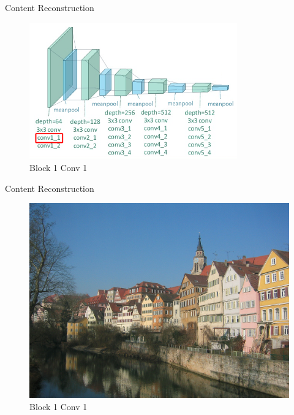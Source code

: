 \documentclass{beamer}
\begin{document}
\begin{frame}{Content Reconstruction}
\begin{figure}[ht]
\centering
\includegraphics[width=0.8\textwidth]{img/vgg19/content/block1_conv1}
\caption*{Block 1 Conv 1}
\end{figure}
\end{frame}



\begin{frame}{Content Reconstruction}
\begin{figure}[ht]
\centering
\includegraphics[width=.8\textwidth]{img/content/block1_conv1}
\caption*{Block 1 Conv 1}
\end{figure}
\end{frame}
\end{document}
